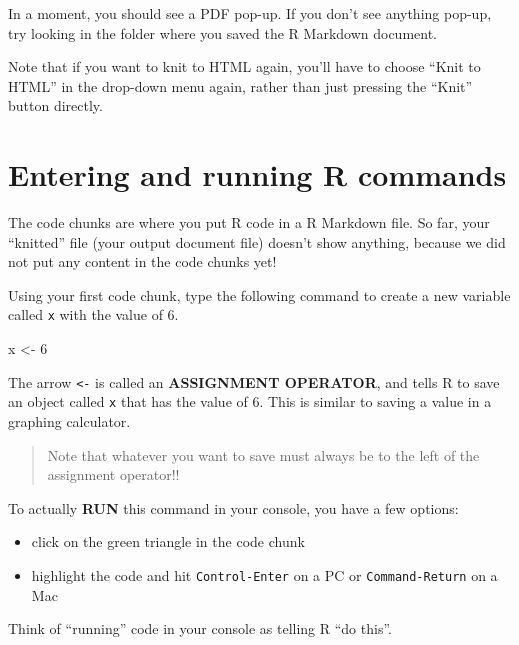 \documentclass[
]{article}
\newenvironment{Shaded}{\begin{snugshade}}{\end{snugshade}}
\newcommand{\DecValTok}[1]{\textcolor[rgb]{0.00,0.00,0.81}{#1}}
\newcommand{\NormalTok}[1]{#1}
\newcommand{\OtherTok}[1]{\textcolor[rgb]{0.56,0.35,0.01}{#1}}
\providecommand{\tightlist}{%
  \setlength{\itemsep}{0pt}\setlength{\parskip}{0pt}}
\begin{document}
In a moment, you should see a PDF pop-up. If you don't see anything
pop-up, try looking in the folder where you saved the R Markdown
document.

\leavevmode\hypertarget{license}{}%
Note that if you want to knit to HTML again, you'll have to choose
``Knit to HTML'' in the drop-down menu again, rather than just pressing
the ``Knit'' button directly.

\hypertarget{entering-and-running-r-commands}{%
\section{Entering and running R
commands}\label{entering-and-running-r-commands}}

The code chunks are where you put R code in a R Markdown file. So far,
your ``knitted'' file (your output document file) doesn't show anything,
because we did not put any content in the code chunks yet!

Using your first code chunk, type the following command to create a new
variable called \texttt{x} with the value of 6.

\begin{Shaded}
\begin{Highlighting}[]
\NormalTok{x }\OtherTok{\textless{}{-}} \DecValTok{6}
\end{Highlighting}
\end{Shaded}

The arrow \texttt{\textless{}-} is called an \textbf{ASSIGNMENT
OPERATOR}, and tells R to save an object called \texttt{x} that has the
value of 6. This is similar to saving a value in a graphing calculator.

\begin{quote}
Note that whatever you want to save must always be to the left of the
assignment operator!!
\end{quote}

To actually \textbf{RUN} this command in your console, you have a few
options:

\begin{itemize}
\tightlist
\item
  click on the green triangle in the code chunk
\item
  highlight the code and hit \texttt{Control-Enter} on a PC or
  \texttt{Command-Return} on a Mac
\end{itemize}

Think of ``running'' code in your console as telling R ``do this''.
\end{document}
